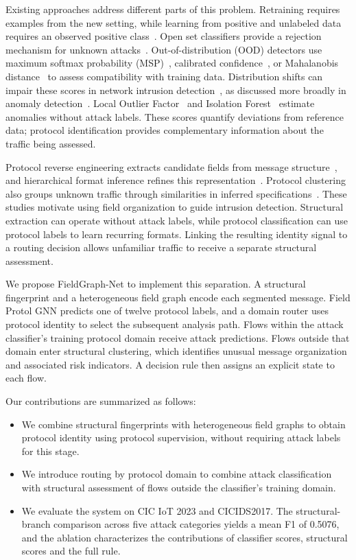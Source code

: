 \documentclass{article}
\begin{document}
Existing approaches address different parts of this problem. Retraining requires
examples from the new setting, while learning from positive and unlabeled data
requires an observed positive class~\cite{elkan2008learning}. Open set classifiers
provide a rejection mechanism for unknown attacks~\cite{farrukh2023openset}.
Out-of-distribution (OOD) detectors use maximum softmax probability
(MSP)~\cite{hendrycks2017msp}, calibrated confidence~\cite{liang2018odin}, or
Mahalanobis distance~\cite{lee2018mahalanobis} to assess compatibility with training
data. Distribution shifts can impair these scores in network intrusion
detection~\cite{corsini2023ood}, as discussed more broadly in anomaly
detection~\cite{ruff2021anomaly}. Local Outlier Factor~\cite{breunig2000lof} and
Isolation Forest~\cite{liu2008iforest} estimate anomalies without attack labels.
These scores quantify deviations from reference data; protocol identification
provides complementary information about the traffic being assessed.

Protocol reverse engineering extracts candidate fields from message
structure~\cite{kleber2018nemesis}, and hierarchical format inference refines this
representation~\cite{hu2026mdiplier}. Protocol clustering also groups unknown traffic
through similarities in inferred specifications~\cite{li2024protocol}. These studies
motivate using field organization to guide intrusion detection. Structural extraction
can operate without attack labels, while protocol classification can use protocol
labels to learn recurring formats. Linking the resulting identity signal to a
routing decision allows unfamiliar traffic to receive a separate structural
assessment.

We propose FieldGraph-Net to implement this separation. A structural fingerprint and
a heterogeneous field graph encode each segmented message. Field Protol GNN predicts
one of twelve protocol labels, and a domain router uses protocol identity to select
the subsequent analysis path. Flows within the attack classifier's training protocol
domain receive attack predictions. Flows outside that domain enter structural
clustering, which identifies unusual message organization and associated risk
indicators. A decision rule then assigns an explicit state to each flow.

Our contributions are summarized as follows:
\begin{itemize}
  \item We combine structural fingerprints with heterogeneous field graphs to obtain
  protocol identity using protocol supervision, without requiring attack labels for
  this stage.
  \item We introduce routing by protocol domain to combine attack classification
  with structural assessment of flows outside the classifier's training domain.
  \item We evaluate the system on CIC IoT 2023 and CICIDS2017. The structural-branch comparison across
  five attack categories yields a mean F1 of 0.5076, and the ablation characterizes
  the contributions of classifier scores, structural scores and the full rule.
\end{itemize}
\end{document}
